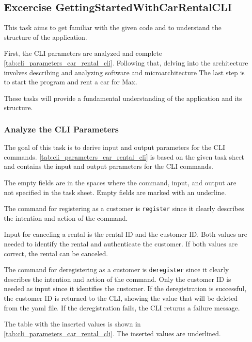 \subsection{Excercise GettingStartedWithCarRentalCLI}
\label{sec:exercise_getting_started_with_car_rental_cli}
This task aims to get familiar with the given code and to understand the structure of the application.

First, the CLI parameters are analyzed and complete \autoref{tab:cli_parameters_car_rental_cli}.
Following that, delving into the architecture involves describing and analyzing software and microarchitecture
The last step is to start the program and rent a car for Max.

These tasks will provide a fundamental understanding of the application and its structure.

\subsubsection*{Analyze the CLI Parameters}
The goal of this task is to derive input and output parameters for the CLI commands.
\autoref{tab:cli_parameters_car_rental_cli} is based on the given task sheet and contains the input and output parameters for the CLI commands.

The empty fields are in the spaces where the command, input, and output are not specified in the task sheet.
Empty fields are marked with an underline.

The command for registering as a customer is \texttt{register} since it clearly describes the intention and action of the command.

Input for canceling a rental is the rental ID and the customer ID.
Both values are needed to identify the rental and authenticate the customer.
If both values are correct, the rental can be canceled.

The command for deregistering as a customer is \texttt{deregister} since it clearly describes the intention and action of the command.
Only the customer ID is needed as input since it identifies the customer.
If the deregistration is successful, the customer ID is returned to the CLI, showing the value that will be deleted from the yaml file.
If the deregistration fails, the CLI returns a failure message.

The table with the inserted values is shown in \autoref{tab:cli_parameters_car_rental_cli}.
The inserted values are underlined.

